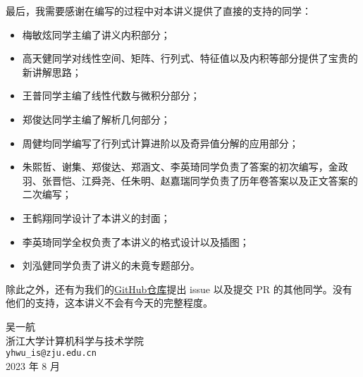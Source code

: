 最后，我需要感谢在编写的过程中对本讲义提供了直接的支持的同学：
\begin{itemize}
    \item 梅敏炫同学主编了讲义内积部分；
    \item 高天健同学对线性空间、矩阵、行列式、特征值以及内积等部分提供了宝贵的新讲解思路；
    \item 王普同学主编了线性代数与微积分部分；
    \item 郑俊达同学主编了解析几何部分；
    \item 周健均同学编写了行列式计算进阶以及奇异值分解的应用部分；
    \item 朱熙哲、谢集、郑俊达、郑涵文、李英琦同学负责了答案的初次编写，金政羽、张晋恺、江舜尧、任朱明、赵嘉瑞同学负责了历年卷答案以及正文答案的二次编写；
    \item 王鹤翔同学设计了本讲义的封面；
    \item 李英琦同学全权负责了本讲义的格式设计以及插图；
    \item 刘泓健同学负责了讲义的未竟专题部分。
\end{itemize}
除此之外，还有为我们的\href{https://github.com/yhwu-is/Linear-Algebra-Left-Undone}{GitHub仓库}提出 issue 以及提交 PR 的其他同学。没有他们的支持，这本讲义不会有今天的完整程度。

\begin{flushright}
    \kaishu
    吴一航 \\
    浙江大学计算机科学与技术学院 \\
    \verb|yhwu_is@zju.edu.cn| \\
    2023 年 8 月
\end{flushright}
